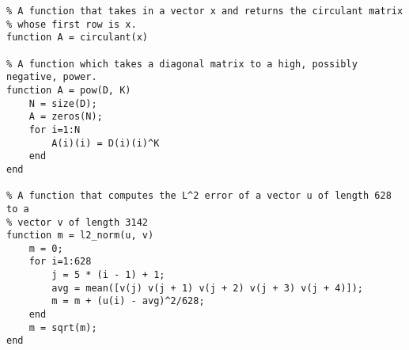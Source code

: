 \documentclass[10pt]{article}
\theoremstyle{definition}
\begin{document}
\begin{verbatim}
% A function that takes in a vector x and returns the circulant matrix
% whose first row is x.
function A = circulant(x)

% A function which takes a diagonal matrix to a high, possibly negative, power.
function A = pow(D, K)
    N = size(D);
    A = zeros(N);
    for i=1:N
        A(i)(i) = D(i)(i)^K
    end
end

% A function that computes the L^2 error of a vector u of length 628 to a
% vector v of length 3142
function m = l2_norm(u, v)
    m = 0;
    for i=1:628
        j = 5 * (i - 1) + 1;
        avg = mean([v(j) v(j + 1) v(j + 2) v(j + 3) v(j + 4)]);
        m = m + (u(i) - avg)^2/628;
    end
    m = sqrt(m);
end
\end{verbatim}
\end{document}
